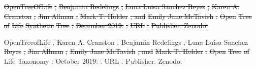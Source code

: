 \documentclass[oupdraft]{sysbio_sse}
\providecommand{\DIFdel}[1]{{\protect\color{red}\sout{#1}}}                      %
\begin{document}
\DIFdel{OpenTreeOfLife}%
\DIFdel{, }%
\DIFdel{Benjamin Redelings}%
\DIFdel{, }%
\DIFdel{Luna Luisa Sanchez Reyes}%
\DIFdel{, }%
\DIFdel{Karen A.
  Cranston}%
\DIFdel{, }%
\DIFdel{Jim Allman}%
\DIFdel{, }%
\DIFdel{Mark T. Holder}%
\DIFdel{, and }%
\DIFdel{Emily Jane McTavish}%
\DIFdel{.
}%
\DIFdel{Open }%
\DIFdel{Tree}%
\DIFdel{of }%
\DIFdel{Life}%
\DIFdel{Synthetic}%
\DIFdel{Tree}%
\DIFdel{.
}%
\DIFdel{December 2019.
}%
\DIFdel{.
}%
\DIFdel{URL }%
\DIFdel{.
}%
\DIFdel{Publisher: Zenodo.
}%

\DIFdel{OpenTreeofLife}%
\DIFdel{, }%
\DIFdel{Karen A. Cranston}%
\DIFdel{, }%
\DIFdel{Benjamin Redelings}%
\DIFdel{, }%
\DIFdel{Luna Luisa
  Sanchez Reyes}%
\DIFdel{, }%
\DIFdel{Jim Allman}%
\DIFdel{, }%
\DIFdel{Emily Jane McTavish}%
\DIFdel{, and }%
\DIFdel{Mark T. Holder}%
\DIFdel{.
}%
\DIFdel{Open }%
\DIFdel{Tree}%
\DIFdel{of }%
\DIFdel{Life}%
\DIFdel{Taxonomy}%
\DIFdel{.
}%
\DIFdel{October 2019.
}%
\DIFdel{.
}%
\DIFdel{URL }%
\DIFdel{.
}%
\DIFdel{Publisher: Zenodo.
}%
\end{document}
